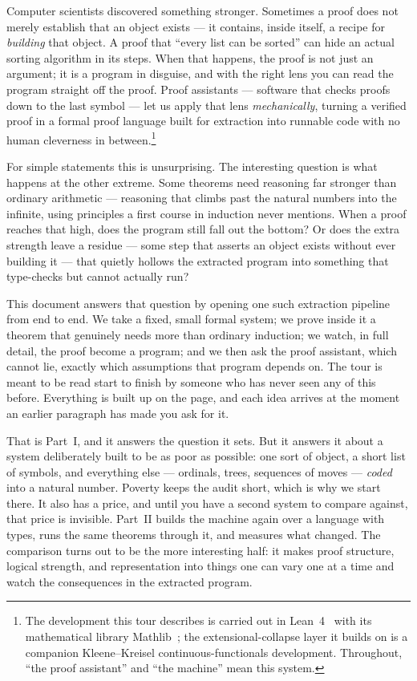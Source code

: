 \documentclass[11pt]{article}
\begin{document}
Computer scientists discovered something stronger. Sometimes a proof does
not merely establish that an object exists --- it contains, inside itself, a
recipe for \emph{building} that object. A proof that ``every list can be
sorted'' can hide an actual sorting algorithm in its steps. When that
happens, the proof is not just an argument; it is a program in disguise, and
with the right lens you can read the program straight off the proof. Proof
assistants --- software that checks proofs down to the last symbol --- let us
apply that lens \emph{mechanically}, turning a verified proof in a formal
proof language built for extraction into runnable code with no human
cleverness in between.\footnote{The development this tour
describes is carried out in Lean~4~\citep{demoura2021} with its mathematical
library Mathlib~\citep{mathlib2020}; the extensional-collapse layer it builds
on is a companion Kleene--Kreisel continuous-functionals development.
Throughout, ``the proof assistant'' and ``the machine'' mean this system.}

For simple statements this is unsurprising. The interesting question is what
happens at the other extreme. Some theorems need reasoning far stronger than
ordinary arithmetic --- reasoning that climbs past the natural numbers into
the infinite, using principles a first course in induction never mentions.
When a proof reaches that high, does the program still fall out the bottom?
Or does the extra strength leave a residue --- some step that asserts an
object exists without ever building it --- that quietly hollows the extracted
program into something that type-checks but cannot actually run?

This document answers that question by opening one such extraction pipeline
from end to end. We take a fixed, small formal system; we prove inside it a
theorem that genuinely needs more than ordinary induction; we watch, in full
detail, the proof become a program; and we then ask the proof assistant,
which cannot lie, exactly which assumptions that program depends on. The
tour is meant to be read start to finish by someone who has never seen any
of this before. Everything is built up on the page, and each idea arrives at
the moment an earlier paragraph has made you ask for it.

That is Part~I, and it answers the question it sets. But it answers it about a
system deliberately built to be as poor as possible: one sort of object, a
short list of symbols, and everything else --- ordinals, trees, sequences of
moves --- \emph{coded} into a natural number. Poverty keeps the audit short,
which is why we start there. It also has a price, and until you have a second
system to compare against, that price is invisible. Part~II builds the machine
again over a language with types, runs the same theorems through it, and
measures what changed. The comparison turns out to be the more interesting
half: it makes proof structure, logical strength, and representation into
things one can vary one at a time and watch the consequences in the extracted
program.
\end{document}
